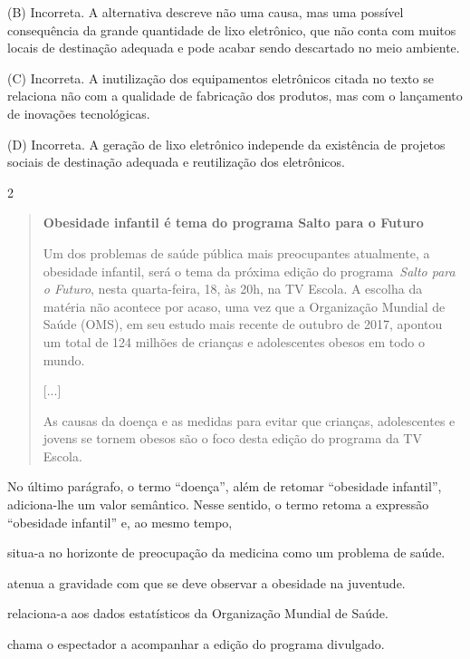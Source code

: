 (B) Incorreta. A alternativa descreve não uma causa, mas uma possível
consequência da grande quantidade de lixo eletrônico, que não conta com
muitos locais de destinação adequada e pode acabar sendo descartado no
meio ambiente.

(C) Incorreta. A inutilização dos equipamentos eletrônicos citada no
texto se relaciona não com a qualidade de fabricação dos produtos, mas
com o lançamento de inovações tecnológicas.

(D) Incorreta. A geração de lixo eletrônico independe da existência de
projetos sociais de destinação adequada e reutilização dos eletrônicos.

\num{2}

\begin{quote}
\textbf{Obesidade infantil é tema do programa Salto para o Futuro}

Um dos problemas de saúde pública mais preocupantes atualmente, a
obesidade infantil, será o tema da próxima edição do
programa~\emph{Salto para o Futuro}, nesta quarta-feira, 18, às 20h, na
TV Escola. A escolha da matéria não acontece por acaso, uma vez que a
Organização Mundial de Saúde (OMS), em seu estudo mais recente de
outubro de 2017, apontou um total de 124 milhões de crianças e
adolescentes obesos em todo o mundo.

{[}...{]}

As causas da doença e as medidas para evitar que crianças, adolescentes
e jovens se tornem obesos são o foco desta edição do programa da TV
Escola.
\end{quote}


No último parágrafo, o termo ``doença'', além de retomar ``obesidade
infantil'', adiciona-lhe um valor semântico. Nesse sentido, o termo
retoma a expressão ``obesidade infantil'' e, ao mesmo tempo,

\begin{escolha}
\item situa-a no horizonte de preocupação da medicina como um problema de
saúde.

\item atenua a gravidade com que se deve observar a obesidade na juventude.

\item relaciona-a aos dados estatísticos da Organização Mundial de Saúde.

\item chama o espectador a acompanhar a edição do programa divulgado.
\end{escolha}

